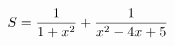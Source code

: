 \documentclass[preview]{standalone}
\begin{document}
\begin{align*}
\special{dvisvgm:raw <g id='unique000'>}S=\frac{1}{1+x^2}+\frac{1}{x^2-4x+5}\special{dvisvgm:raw </g>}
\end{align*}
\end{document}
